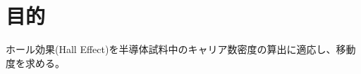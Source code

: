 \documentclass[../../../main]{subfiles}
\begin{document}
\section{目的}
ホール効果(Hall Effect)を半導体試料中のキャリア数密度の算出に適応し、移動度を求める。
\end{document}
